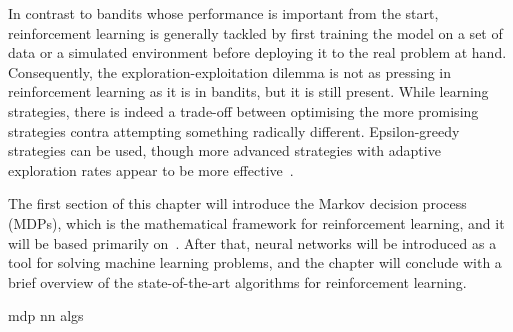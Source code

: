 In contrast to bandits whose performance is important from the start, reinforcement learning is generally tackled by first training the model on a set of data or a simulated environment before deploying it to the real problem at hand.
Consequently, the exploration-exploitation dilemma is not as pressing in reinforcement learning as it is in bandits, but it is still present.
While learning strategies, there is indeed a trade-off between optimising the more promising strategies contra attempting something radically different.
Epsilon-greedy strategies can be used, though more advanced strategies with adaptive exploration rates appear to be more effective~\autocite{tokic2011}.

The first section of this chapter will introduce the Markov decision process (MDPs), which is the mathematical framework for reinforcement learning, and it will be based primarily on~\autocite{lattimore2020,sutton2018}.
After that, neural networks will be introduced as a tool for solving machine learning problems, and the chapter will conclude with a brief overview of the state-of-the-art algorithms for reinforcement learning.


{mdp}
{nn}
{algs}
